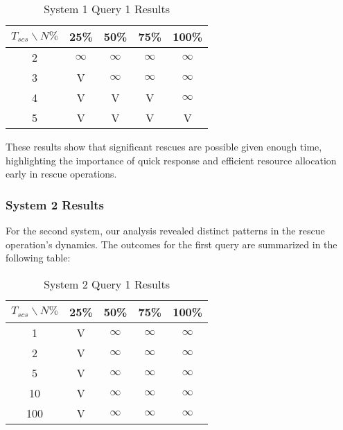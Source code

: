 \begin{table}[H]
	\centering
	\small
	\begin{tabular}{|c|c|c|c|c|}
		\hline
		$T_{scs}\backslash N\%$ & 25\% & 50\% & 75\% & 100\% \\ \hline
		2                       & $\infty$   & $\infty$   & $\infty$   & $\infty$    \\ \hline
		3                       & V   & $\infty$   & $\infty$   & $\infty$    \\ \hline
		4                       & V   & V   & V   & $\infty$    \\ \hline
		5                       & V   & V   & V   & V    \\ \hline
	\end{tabular}
	\caption{System 1 Query 1 Results}
	\label{tab:system1}
	\normalsize
\end{table}

These results show that significant rescues are possible given enough time, highlighting the importance of quick response and efficient resource allocation early in rescue operations.

\subsubsection{System 2 Results}
For the second system, our analysis revealed distinct patterns in the rescue operation's dynamics. 
The outcomes for the first query are summarized in the following table:

\begin{table}[H]
	\centering
	\small
	\begin{tabular}{|c|c|c|c|c|}
		\hline
		$T_{scs}\backslash N\%$ & 25\% & 50\% & 75\% & 100\% \\ \hline
		1                     & V   & $\infty$  & $\infty$   &$\infty$    \\ \hline
		2                       & V   & $\infty$  & $\infty$   &$\infty$    \\ \hline
		5                      & V   & $\infty$  & $\infty$   &$\infty$    \\ \hline
		10                      & V   & $\infty$  & $\infty$   &$\infty$    \\ \hline
		100                       & V   & $\infty$  & $\infty$   &$\infty$    \\ \hline
	\end{tabular}
	\caption{System 2 Query 1 Results}
	\label{tab:system1}
	\normalsize
\end{table}


